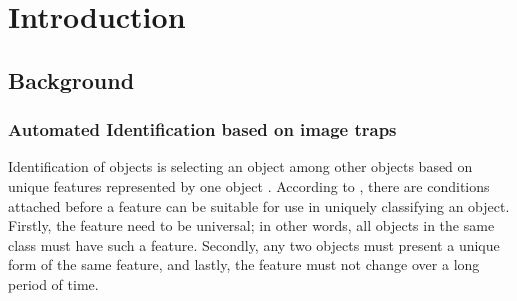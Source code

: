 %
%
%

\chapter{Introduction} %


\newcommand{\keyword}[1]{\textbf{#1}}
\newcommand{\tabhead}[1]{\textbf{#1}}
\newcommand{\code}[1]{\texttt{#1}}
\newcommand{\file}[1]{\texttt{\bfseries#1}}
\newcommand{\option}[1]{\texttt{\itshape#1}}


\section{Background} %

\subsection{Automated Identification based on image traps}

Identification of objects is selecting an object among other objects based on unique features represented by one object \cite{jain2007handbook}. According to \citeauthor{jain2004introduction} \citeyear{jain2004introduction} \cite{jain2004introduction}, there are conditions attached before a feature can be suitable for use in uniquely classifying an object. Firstly, the feature need to be universal; in other words, all objects in the same class must have such a feature. Secondly, any two objects must present a unique form of the same feature, and lastly, the feature must not change over a long period of time.

